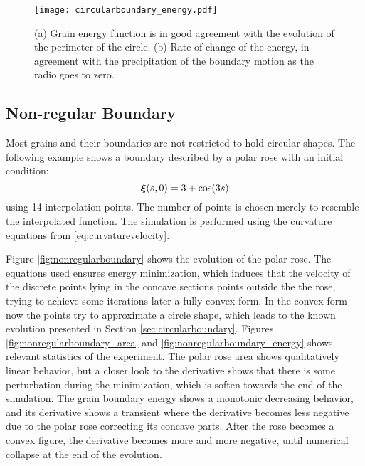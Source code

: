 \begin{figure}[t]
    \centering
    \texttt{[image: circularboundary\_energy.pdf]}
    \subfloat[\label{fig:circenergy}]{\hspace{.55\linewidth}}
    \subfloat[\label{fig:circdEdt}]{\hspace{.45\linewidth}}
    \caption[Circular boundary energy and rate of change]{(a) Grain energy function is in good agreement with the evolution of the perimeter of the circle. (b) Rate of change of the energy, in agreement with the precipitation of the boundary motion as the radio goes to zero.}
    \label{fig:circularboundary_energy}
\end{figure}

\subsection{Non-regular Boundary}

Most grains and their boundaries are not restricted to hold circular shapes. The following example shows a boundary described by a polar rose with an initial condition:
\begin{equation*}
    \bm{\xi}(s,0) = 3 + \cos(3s)
\end{equation*}
using 14 interpolation points. The number of points is chosen merely to resemble the interpolated function. The simulation is performed using the curvature equations from \eqref{eq:curvaturevelocity}. 

Figure \ref{fig:nonregularboundary} shows the evolution of the polar rose. The equations used ensures energy minimization, which induces that the velocity of the discrete points lying in the concave sections points outside the the rose, trying to achieve some iterations later a fully convex form. In the convex form now the points try to approximate a circle shape, which leads to the known evolution presented in Section \ref{sec:circularboundary}. Figures \ref{fig:nonregularboundary_area} and \ref{fig:nonregularboundary_energy} shows relevant statistics of the experiment. The polar rose area shows qualitatively linear behavior, but a closer look to the derivative shows that there is some perturbation during the minimization, which is soften towards the end of the simulation. The grain boundary energy shows a monotonic decreasing behavior, and its derivative shows a transient where the derivative becomes less negative due to the polar rose correcting its concave parts. After the rose becomes a convex figure, the derivative becomes more and more negative, until numerical collapse at the end of the evolution.

